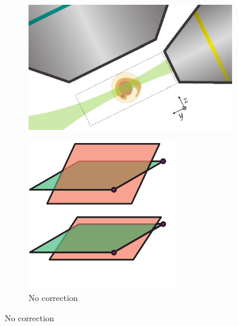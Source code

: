 \begin{figure}
	\centering
    \begin{subfigure}[t]{\textwidth}
        \centering
        \includegraphics{geometry/Schematic_thesis}
        \caption{}\label{fig:geometry/Schematic_thesis}
    \end{subfigure}\hfill
    \begin{subfigure}[t]{0.2\textwidth}
        \centering
        \includegraphics[width=\textwidth]{geometry/no_correction}
        \caption{No correction}\label{fig:geometry/no_correction}
    \end{subfigure}\hfill

\end{figure}
